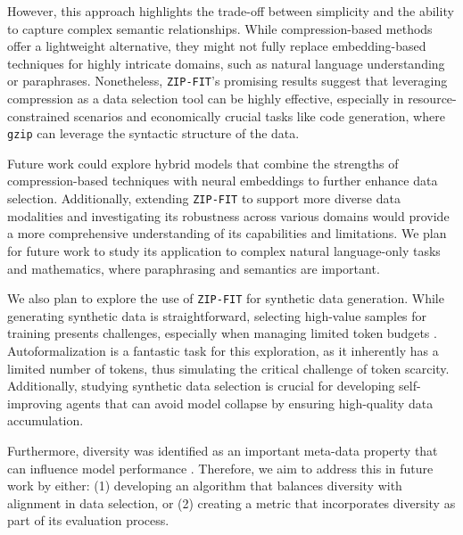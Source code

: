 However, this approach highlights the trade-off between simplicity and the ability to capture complex semantic relationships. 
While compression-based methods offer a lightweight alternative, they might not fully replace embedding-based techniques for highly intricate domains, such as natural language understanding or paraphrases. 
Nonetheless, \texttt{ZIP-FIT}’s promising results suggest that leveraging compression as a data selection tool can be highly effective, especially in resource-constrained scenarios and economically crucial tasks like code generation, where \texttt{gzip} can leverage the syntactic structure of the data.


Future work could explore hybrid models that combine the strengths of compression-based techniques with neural embeddings to further enhance data selection.
Additionally, extending \texttt{ZIP-FIT} to support more diverse data modalities and investigating its robustness across various domains would provide a more comprehensive understanding of its capabilities and limitations.
We plan for future work to study its application to complex natural language-only tasks and mathematics, where paraphrasing and semantics are important.

We also plan to explore the use of \texttt{ZIP-FIT} for synthetic data generation. While generating synthetic data is straightforward, selecting high-value samples for training presents challenges, especially when managing limited token budgets \cite{villalobos2024rundatalimitsllm}. 
Autoformalization is a fantastic task for this exploration, as it inherently has a limited number of tokens, thus simulating the critical challenge of token scarcity. 
Additionally, studying synthetic data selection is crucial for developing self-improving agents that can avoid model collapse \citep{gerstgrasser2024modelcollapseinevitablebreaking,kazdan2024collapseorthrive} by ensuring high-quality data accumulation.

Furthermore, diversity was identified as an important meta-data property that can influence model performance \citep{miranda2024scalediversitycoefficientdata}. 
Therefore, we aim to address this in future work by either:  
(1) developing an algorithm that balances diversity with alignment in data selection, or 
(2) creating a metric that incorporates diversity as part of its evaluation process.

